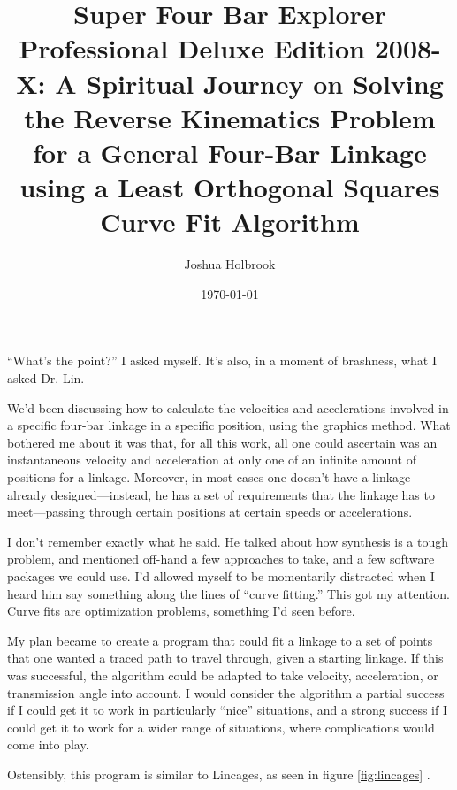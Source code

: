 \documentclass[12pt, letterpaper]{article}
\begin{document}
\title{Super Four Bar Explorer Professional Deluxe Edition 2008-X: A Spiritual Journey on Solving the Reverse Kinematics Problem for a General Four-Bar Linkage using a Least Orthogonal Squares Curve Fit Algorithm}
\author{Joshua Holbrook}
\date{\today}
\maketitle


``What's the point?'' I asked myself.  It's also, in a moment of brashness, what I asked Dr. Lin.

We'd been discussing how to calculate the velocities and accelerations involved in a specific four-bar linkage in a specific position, using the graphics method.  What bothered me about it was that, for all this work, all one could ascertain was an instantaneous velocity and acceleration at only one of an infinite amount of positions for a linkage. Moreover, in most cases one doesn't have a linkage already designed---instead, he has a set of requirements that the linkage has to meet---passing through certain positions at certain speeds or accelerations.

I don't remember exactly what he said. He talked about how synthesis is a tough problem, and mentioned off-hand a few approaches to take, and a few software packages we could use. I'd allowed myself to be momentarily distracted when I heard him say something along the lines of ``curve fitting.'' This got my attention. Curve fits are optimization problems, something I'd seen before.

My plan became to create a program that could fit a linkage to a set of points that one wanted a traced path to travel through, given a starting linkage. If this was successful, the algorithm could be adapted to take velocity, acceleration, or transmission angle into account. I would consider the algorithm a partial success if I could get it to work in particularly ``nice'' situations, and a strong success if I could get it to work for a wider range of situations, where complications would come into play.

Ostensibly, this program is similar to Lincages, as seen in figure \ref{fig:lincages} .
\end{document}
